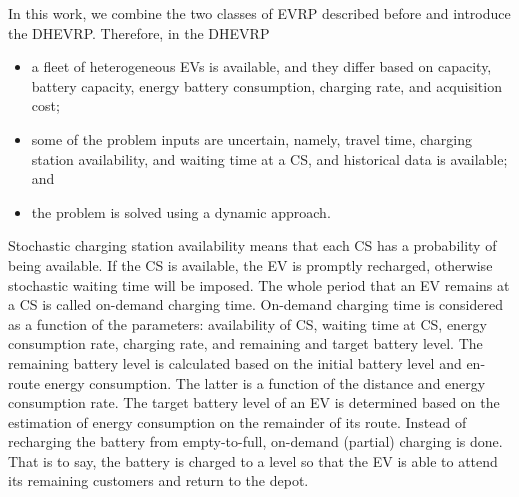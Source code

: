 \documentclass[11pt]{article}
\begin{document}
In this work, we combine the two classes of EVRP described before and introduce the DHEVRP. Therefore, in the DHEVRP
\begin{itemize}
\item a fleet of heterogeneous EVs is available, and they differ based on capacity, battery capacity, energy battery consumption, charging rate, and acquisition cost;
\item some of the problem inputs are uncertain, namely, travel time, charging station availability, and waiting time at a CS, and historical data is available; and
\item the problem is solved using a dynamic approach. 
\end{itemize}
Stochastic charging station availability means that each CS has a probability of being available. If the CS is available, the EV is promptly recharged, otherwise stochastic waiting time will be imposed. The whole period that an EV remains at a CS is called on-demand charging time. On-demand charging time is considered as a function of the parameters: availability of CS, waiting time at CS, energy consumption rate, charging rate, and remaining and target battery level. The remaining battery level is calculated based on the initial battery level and en-route energy consumption. The latter is a function of the distance and energy consumption rate. The target battery level of an EV is determined based on the estimation of energy consumption on the remainder of its route. Instead of recharging the battery from empty-to-full, on-demand (partial) charging is done. That is to say, the battery is charged to a level so that the EV is able to attend its remaining customers and return to the depot. 
\end{document}
